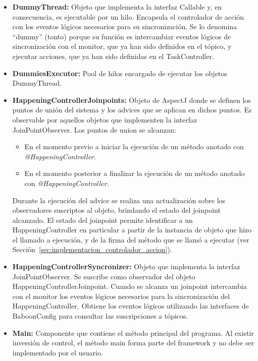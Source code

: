 \begin{itemize}
  \item \textbf{DummyThread: } Objeto que implementa la interfaz Callable y, en
  consecuencia, es ejecutable por un hilo. Encapsula el controlador de acción
  con los eventos lógicos necesarios para su sincronización. Se lo denomina
  ``dummy'' (tonto) porque su función es intercambiar eventos lógicos de
  sincronización con el monitor, que ya han sido definidos en el tópico, y
  ejecutar acciones, que ya han sido definidas en el TaskController.
  
  \item \textbf{DummiesExecutor: } Pool de hilos encargado de ejecutar los
  objetos DummyThread.
  
  \item \textbf{HappeningControllerJoinpoints: } Objeto de AspectJ donde se
  definen los puntos de unión del sistema y los advices que se aplican en
  dichos puntos.
  Es observable por aquellos objetos que implementen la interfaz
  JoinPointObserver.
  Los puntos de union se alcanzan:
  	\begin{itemize}
  	  \item  En el momento previo a iniciar la ejecución de un
  	  método anotado con \emph{@HappeningController}.
  	  \item En el momento posterior a finalizar la ejecución de un
  	  método anotado con \emph{@HappeningController}.
  	\end{itemize}
  Durante la ejecución del advice se realiza una actualización sobre los
  observadores suscriptos al objeto, brindando el estado del joinpoint
  alcanzado. El estado del joinpoint permite identificar a un
  HappeningController en particular a partir de la instancia de objeto que hizo
  el llamado a ejecución, y de la firma del método que se llamó a ejecutar (ver
  Sección~\ref{sec:implementacion_controlador_accion}).
  
  \item \textbf{HappeningControllerSyncronizer: } Objeto que implementa la
  interfaz JoinPointObserver. Se suscribe como observador del objeto
  HappeningControllerJoinpoint. Cuando se alcanza un joinpoint intercambia con
  el monitor los eventos lógicos necesarios para la sincronización del
  HappeningController. Obtiene los eventos lógicos utilizando las
  interfaces de BaboonConfig para consultar las suscripciones a tópicos.
  
  \item \textbf{Main: } Componente que contiene el método principal del
  programa. Al existir inversión de control, el método main forma parte del
  framework y no debe ser implementado por el usuario.
\end{itemize}

